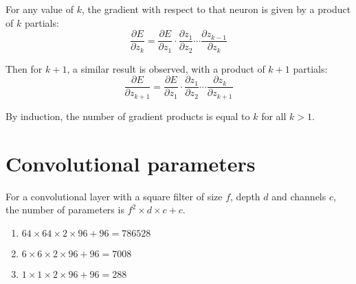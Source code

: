 \documentclass[twocolumn, 9pt]{article}
\newcommand{\del}{\partial}
\begin{document}
For any value of $k$, the gradient with respect to that neuron is given by a product of $k$ partials:
\begin{equation*}
	\dfrac{\del E}{\del z_k} = \dfrac{\del E}{\del z_1} \cdot \dfrac{\del z_1}{\del z_2} \cdots \dfrac{\del z_{k-1}}{\del z_k}
\end{equation*}

Then for $k+1$, a similar result is observed, with a product of $k+1$ partials:
\begin{equation*}
	\dfrac{\del E}{\del z_{k+1}} = \dfrac{\del E}{\del z_1} \cdot \dfrac{\del z_1}{\del z_2} \cdots \dfrac{\del z_{k}}{\del z_{k+1}}
\end{equation*}

By induction, the number of gradient products is equal to $k$ for all $k>1$.
\section{Convolutional parameters}
For a convolutional layer with a square filter of size $f$, depth $d$ and channels $c$, the number of parameters is $f^2 \times d \times c + c$.
\begin{enumerate}
	\item $64 \times 64 \times 2 \times 96 + 96 = 786528$
	\item $6 \times 6 \times 2 \times 96 + 96 = 7008$
	\item $1 \times 1 \times 2 \times 96 + 96 = 288$
\end{enumerate}
\end{document}
